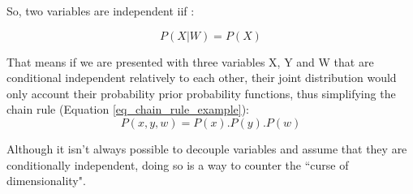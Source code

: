 So, two variables are independent iif \cite{feller1}\cite{Norvig2003}:

\begin{equation}
P(X\vert W) = P(X)
\end{equation}

That means if we are presented with three variables  X, Y and W that are conditional independent relatively to each other, their joint distribution would only account their probability prior probability functions, thus simplifying the chain rule (Equation \eqref{eq_chain_rule_example}):
\begin{equation}
P(x, y , w) = P(x) . P(y) . P(w)
\end{equation}

Although it isn't always possible to decouple variables and assume that they are conditionally independent, doing so is a way to counter the ``curse of dimensionality". 






